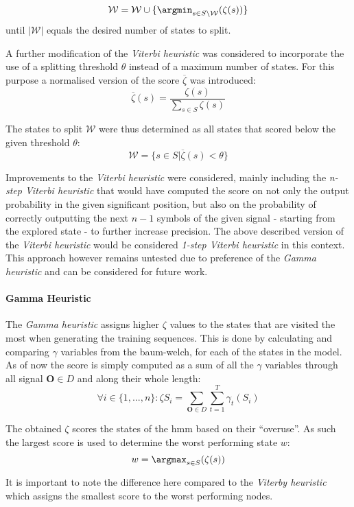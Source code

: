 $$\mathcal{W} = \mathcal{W} \cup \{\argmin_{s\in S\setminus \mathcal{W}}(\zeta(s))\}$$
until $|\mathcal{W}|$ equals the desired number of states to split.

A further modification of the \emph{Viterbi heuristic} was considered to incorporate the use of a splitting threshold $\theta$ instead of a maximum number of states. For this purpose a normalised version of the score $\overline{\zeta}$ was introduced:
$$\overline{\zeta}(s) = \frac{\zeta(s)}{\sum_{s\in S}\zeta(s)}$$

The states to split $\mathcal{W}$ were thus determined as all states that scored below the given threshold $\theta$:
$$\mathcal{W} = \{s\in S|\overline\zeta(s) < \theta\}$$

Improvements to the \emph{Viterbi heuristic} were considered, mainly including the \emph{n-step Viterbi heuristic} that would have computed the score on not only the output probability in the given significant position, but also on the probability of correctly outputting the next $n -1$ symbols of the given signal - starting from the explored state - to further increase precision. The above described version of the \emph{Viterbi heuristic} would be considered \emph{1-step Viterbi heuristic} in this context. This approach however remains untested due to preference of the \emph{Gamma heuristic} and can be considered for future work.

\paragraph{Gamma Heuristic}

The \emph{Gamma heuristic} assigns higher $\zeta$ values to the states that are visited the most when generating the 
training sequences. This is done by calculating and comparing $\gamma$ variables from the \gls{baum-welch}, for each of the states in the model. As of now the score is simply computed as a sum of all the $\gamma$ variables through all signal $\mathbf{O}\in D$ and along their whole length:
$$\forall i\in\{1,...,n\}: \zeta{S_i} = \sum_{\mathbf{O}\in D}\sum_{t=1}^{T}\gamma_t(S_i)$$

The obtained $\zeta$ scores the states of the \gls{hmm} based on their ``overuse''. As such the largest score is used to determine the worst performing state $w$:
$$w = \argmax_{s\in S}(\zeta(s))$$

It is important to note the difference here compared to the \emph{Viterby heuristic} which assigns the smallest score to the worst performing nodes.

